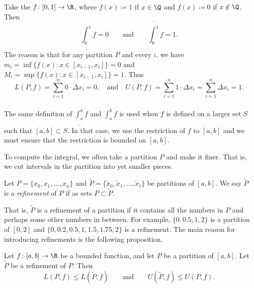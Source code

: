 \begin{example} \label{example:dirichletfunc}
Take the 
$f \colon [0,1] \to \R$, where $f(x) \coloneqq 1$ if
$x \in \Q$ and $f(x) \coloneqq 0$ if $x \notin \Q$.  Then
\begin{equation*}
\underline{\int_0^1} f = 0 \qquad \text{and} \qquad
\overline{\int_0^1} f = 1 .
\end{equation*}
The reason is that for any partition $P$ and every $i$, we have 
$m_i = \inf \bigl\{ f(x) : x \in [x_{i-1},x_i] \bigr\} = 0$  and
$M_i = \sup \bigl\{ f(x) : x \in [x_{i-1},x_i] \bigr\} = 1$.  Thus
\begin{equation*}
L(P,f) = \sum_{i=1}^n 0 \cdot \Delta x_i = 0 , \quad \text{and} \quad
U(P,f) = \sum_{i=1}^n 1 \cdot \Delta x_i = \sum_{i=1}^n \Delta x_i = 1  .
\end{equation*}
\end{example}

\begin{remark}
The same definition of $\underline{\int_a^b} f$ and
$\overline{\int_a^b} f$
is used when $f$ is defined on a larger set $S$ such that
$[a,b] \subset S$.  In that case, we use the restriction of $f$ to $[a,b]$
and we must ensure that the restriction is bounded on $[a,b]$.
\end{remark}

To compute the integral, we often take a partition $P$ and make it finer.
That is, we cut intervals in the partition into yet smaller pieces.

\begin{defn}
Let $P = \{ x_0, x_1, \ldots, x_n \}$ and
$\widetilde{P} = \{ \widetilde{x}_0, \widetilde{x}_1, \ldots,
\widetilde{x}_{\ell} \}$ be
partitions of $[a,b]$.  We say $\widetilde{P}$ is a
\emph{refinement} of $P$
if as sets $P \subset \widetilde{P}$.
\end{defn}

That is, $\widetilde{P}$ is a refinement of a partition if it contains all the
numbers in $P$ and perhaps some other numbers in between.  For example,
$\{ 0, 0.5, 1, 2 \}$ is a partition of $[0,2]$ and
$\{ 0, 0.2, 0.5, 1, 1.5, 1.75, 2 \}$ is a refinement.
The main reason for introducing refinements is the following proposition.

\begin{prop} \label{prop:refinement}
Let $f \colon [a,b] \to \R$ be a bounded function, and let $P$
be a partition of $[a,b]$.  Let $\widetilde{P}$ be a refinement of $P$.
Then
\begin{equation*}
L(P,f) \leq L(\widetilde{P},f) 
\qquad \text{and} \qquad
U(\widetilde{P},f) \leq U(P,f) .
\end{equation*}
\end{prop}

